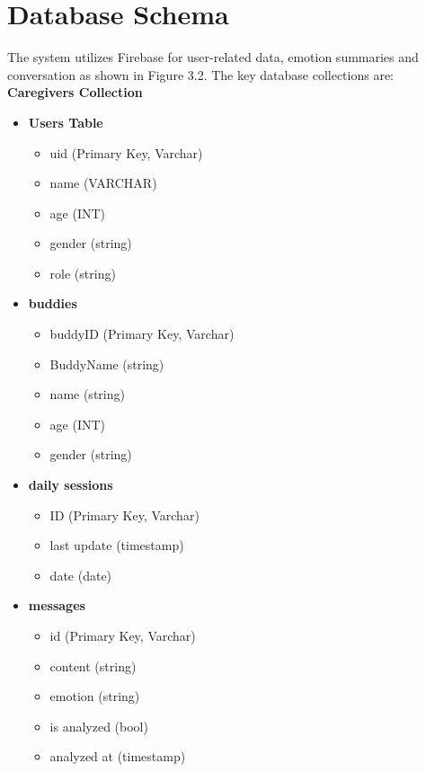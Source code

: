 \newpage
\section{Database Schema}
\noindent\hspace{2.2em} 
The system utilizes Firebase for user-related data, emotion summaries and conversation as shown in Figure 3.2. The key database collections are: \\
\textbf{Caregivers Collection}
\begin{itemize}
	\item \textbf{Users Table}
	\begin{itemize}
		\item uid (Primary Key, Varchar)
		\item name (VARCHAR)
		\item age (INT)
		\item gender  (string)
		\item role  (string)
	\end{itemize}
	\vspace{0.6cm}
	\item \textbf{buddies}
	\begin{itemize}
		\item buddyID (Primary Key, Varchar)
		\item BuddyName  (string)
		\item name  (string)
		\item age (INT)
		\item gender   (string)
	\end{itemize}
	\vspace{0.6cm}
	\item \textbf{daily sessions}
	\begin{itemize}
		\item ID  (Primary Key, Varchar)
		\item last update   (timestamp)
		\item date   (date)
	\end{itemize}
	\vspace{0.6cm}
	\item \textbf{messages }
	\begin{itemize}
		\item id   (Primary Key, Varchar)
		\item content    (string)
		\item emotion   (string)
		\item is analyzed  (bool)
		\item analyzed at (timestamp)

\end{itemize}
\end{itemize}
